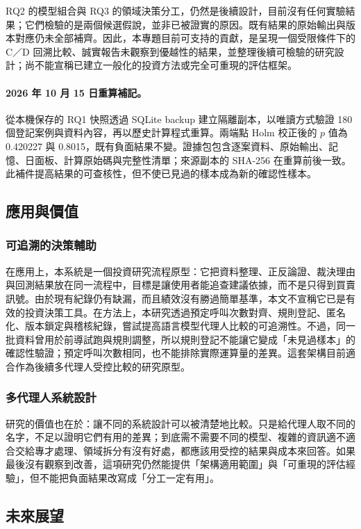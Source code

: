 \documentclass[12pt,a4paper]{article}
\numberwithin{table}{section}
\numberwithin{figure}{section}
\begin{document}
RQ2 的模型組合與 RQ3 的領域決策分工，仍然是後續設計，目前沒有任何實驗結果；它們檢驗的是兩個候選假說，並非已被證實的原因。既有結果的原始輸出與版本對應仍未全部補齊。因此，本專題目前可支持的貢獻，是呈現一個受限條件下的 C／D 回溯比較、誠實報告未觀察到優越性的結果，並整理後續可檢驗的研究設計；尚不能宣稱已建立一般化的投資方法或完全可重現的評估框架。

\paragraph{2026 年 10 月 15 日重算補記。} 從本機保存的 RQ1 快照透過 SQLite backup 建立隔離副本，以唯讀方式驗證 180 個登記案例與資料內容，再以歷史計算程式重算。兩端點 Holm 校正後的 $p$ 值為 0.420227 與 0.8015，既有負面結果不變。證據包包含逐案資料、原始輸出、記憶、日面板、計算原始碼與完整性清單；來源副本的 SHA-256 在重算前後一致。此補件提高結果的可查核性，但不使已見過的樣本成為新的確認性樣本。

\subsection{應用與價值}

\subsubsection{可追溯的決策輔助}
在應用上，本系統是一個投資研究流程原型：它把資料整理、正反論證、裁決理由與回測結果放在同一流程中，目標是讓使用者能追查建議依據，而不是只得到買賣訊號。由於現有紀錄仍有缺漏，而且績效沒有勝過簡單基準，本文不宣稱它已是有效的投資決策工具。在方法上，本研究透過預定呼叫次數對齊、規則登記、匿名化、版本鎖定與稽核紀錄，嘗試提高語言模型代理人比較的可追溯性。不過，同一批資料曾用於前導試跑與規則調整，所以規則登記不能讓它變成「未見過樣本」的確認性驗證；預定呼叫次數相同，也不能排除實際運算量的差異。這套架構目前適合作為後續多代理人受控比較的研究原型。
\subsubsection{多代理人系統設計}

研究的價值也在於：讓不同的系統設計可以被清楚地比較。只是給代理人取不同的名字，不足以證明它們有用的差異；到底需不需要不同的模型、複雜的資訊適不適合交給專才處理、領域拆分有沒有好處，都應該用受控的結果與成本來回答。如果最後沒有觀察到改善，這項研究仍然能提供「架構適用範圍」與「可重現的評估經驗」，但不能把負面結果改寫成「分工一定有用」。

\subsection{未來展望}
\end{document}
